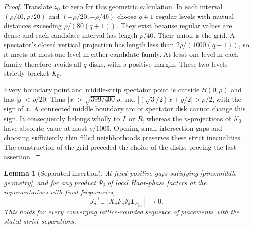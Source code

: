 \documentclass[11pt]{article}
\newtheorem{lemma}[theorem]{Lemma}
\theoremstyle{definition}
\theoremstyle{remark}
\numberwithin{equation}{section}
\begin{document}
\begin{proof}
Translate $z_0$ to zero for this geometric calculation.  In each
interval $(\rho/40,\rho/20)$ and $(-\rho/20,-\rho/40)$ choose
$q+1$ regular levels with mutual distances exceeding
$\rho/(80(q+1))$.  They exist because regular values are dense
and each candidate interval has length $\rho/40$.  Their union is
the grid.  A spectator's closed vertical projection has length less
than $2\rho/(1000(q+1))$, so it meets at most one level in either
candidate family.  At least one level in each family therefore
avoids all $q$ disks, with a positive margin.  These two levels
strictly bracket $K_0$.

Every boundary point and middle-strip spectator point is outside
$B(0,\rho)$ and has $|y|<\rho/20$.  Thus
$|x|>\sqrt{399/400}\,\rho$, and
$|(\sqrt3/2)x+y/2|>\rho/2$, with the sign of $x$.
A connected middle boundary arc or spectator disk cannot change this
sign.  It consequently belongs wholly to $L$ or $R$, whereas the
$u$-projections of $K_0$ have absolute value at most $\rho/1000$.
Opening small intersection gaps and choosing sufficiently thin filled
neighborhoods preserves these strict inequalities.  The construction
of the grid preceded the choice of the disks, proving the last assertion.
\end{proof}

\begin{lemma}[Separated insertion]\label{pins:three-moves}
At fixed positive gaps satisfying \eqref{pins:middle-geometry}, and for
any product $\Psi_\delta$ of local Haar-phase factors at the
representatives with fixed frequencies,
\begin{equation}\label{pins:separated-identity}
 J_\delta^{-1}\mathbb E\left[
 X_\delta F_\delta\Psi_\delta\mathbf 1_{P_{\mathrm{loc}}}\right]
 \longrightarrow0.
\end{equation}
This holds for every converging lattice-rounded sequence of placements
with the stated strict separations.
\end{lemma}
\end{document}
